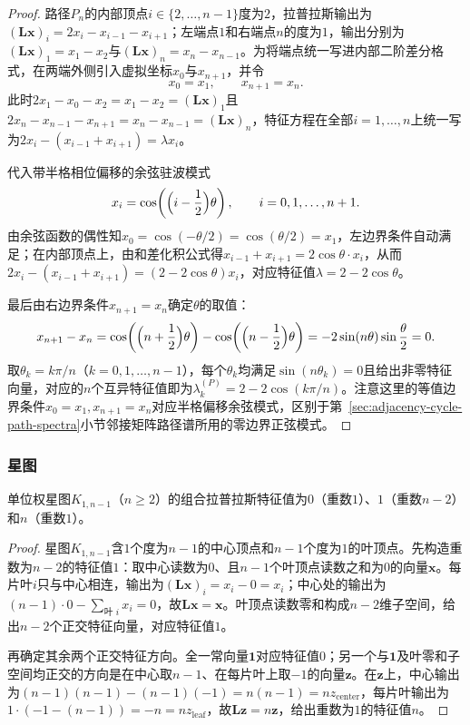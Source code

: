 \begin{proof}
路径$P_n$的内部顶点$i\in\{2,\ldots,n-1\}$度为$2$，拉普拉斯输出为$(\bm L\bm x)_i=2x_i-x_{i-1}-x_{i+1}$；左端点$1$和右端点$n$的度为$1$，输出分别为$(\bm L\bm x)_1=x_1-x_2$与$(\bm L\bm x)_n=x_n-x_{n-1}$。为将端点统一写进内部二阶差分格式，在两端外侧引入虚拟坐标$x_0$与$x_{n+1}$，并令
\[
  x_0=x_1,\qquad x_{n+1}=x_n.
\]
此时$2x_1-x_0-x_2=x_1-x_2=(\bm L\bm x)_1$且$2x_n-x_{n-1}-x_{n+1}=x_n-x_{n-1}=(\bm L\bm x)_n$，特征方程在全部$i=1,\ldots,n$上统一写为$2x_i-(x_{i-1}+x_{i+1})=\lambda x_i$。

代入带半格相位偏移的余弦驻波模式
\[
  x_i=\cos\!\left(\Bigl(i-\frac12\Bigr)\theta\right),\qquad i=0,1,\ldots,n+1.
\]
由余弦函数的偶性知$x_0=\cos(-\theta/2)=\cos(\theta/2)=x_1$，左边界条件自动满足；在内部顶点上，由和差化积公式得$x_{i-1}+x_{i+1}=2\cos\theta\cdot x_i$，从而$2x_i-(x_{i-1}+x_{i+1})=(2-2\cos\theta)x_i$，对应特征值$\lambda=2-2\cos\theta$。

最后由右边界条件$x_{n+1}=x_n$确定$\theta$的取值：
\[
  x_{n+1}-x_n=\cos\!\left(\Bigl(n+\frac12\Bigr)\theta\right)-\cos\!\left(\Bigl(n-\frac12\Bigr)\theta\right)=-2\sin(n\theta)\sin\frac{\theta}{2}=0.
\]
取$\theta_k=k\pi/n$（$k=0,1,\ldots,n-1$），每个$\theta_k$均满足$\sin(n\theta_k)=0$且给出非零特征向量，对应的$n$个互异特征值即为$\lambda_k^{(P)}=2-2\cos(k\pi/n)$。注意这里的等值边界条件$x_0=x_1,x_{n+1}=x_n$对应半格偏移余弦模式，区别于第~\ref{sec:adjacency-cycle-path-spectra}小节邻接矩阵路径谱所用的零边界正弦模式。
\end{proof}

\subsubsection{星图}
\label{sec:graph-star-laplacian-spectrum}

\begin{theorem}[星图的拉普拉斯谱]
\label{thm:graph-star-laplacian-spectrum}
单位权星图$K_{1,n-1}$（$n\geq 2$）的组合拉普拉斯特征值为$0$（重数$1$）、$1$（重数$n-2$）和$n$（重数$1$）。
\end{theorem}

\begin{proof}
星图$K_{1,n-1}$含$1$个度为$n-1$的中心顶点和$n-1$个度为$1$的叶顶点。先构造重数为$n-2$的特征值$1$：取中心读数为$0$、且$n-1$个叶顶点读数之和为$0$的向量$\bm x$。每片叶$i$只与中心相连，输出为$(\bm L\bm x)_i=x_i-0=x_i$；中心处的输出为$(n-1)\cdot 0-\sum_{\text{叶 }i}x_i=0$，故$\bm L\bm x=\bm x$。叶顶点读数零和构成$n-2$维子空间，给出$n-2$个正交特征向量，对应特征值$1$。

再确定其余两个正交特征方向。全一常向量$\bm 1$对应特征值$0$；另一个与$\bm 1$及叶零和子空间均正交的方向是在中心取$n-1$、在每片叶上取$-1$的向量$\bm z$。在$\bm z$上，中心输出为$(n-1)(n-1)-(n-1)(-1)=n(n-1)=n z_{\text{center}}$，每片叶输出为$1\cdot(-1-(n-1))=-n=n z_{\text{leaf}}$，故$\bm L\bm z=n\bm z$，给出重数为$1$的特征值$n$。
\end{proof}

